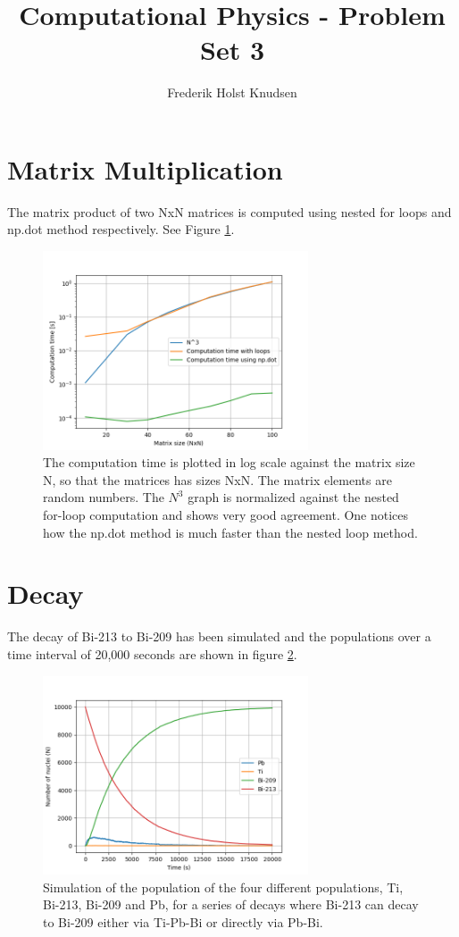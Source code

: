 \documentclass[11pt]{article}
\title{Computational Physics -  Problem Set 3}
\author{Frederik Holst Knudsen}
\begin{document}
\maketitle

\section{Matrix Multiplication}
The matrix product of two NxN matrices is computed using nested for loops and np.dot method respectively. See Figure \ref*{MM}.

\begin{figure}[!htbp]
    \centering
    \includegraphics[width=0.7\textwidth]{loops_comp.png}
    \caption{The computation time is plotted in log scale against the matrix size N, so that the matrices has sizes NxN. The matrix elements are random numbers. The $N^3$ graph is normalized against the nested for-loop computation and shows very good agreement. One notices how the np.dot method is much faster than the nested loop method.}
    \label{MM}
\end{figure}


\section{Decay}
The decay of Bi-213 to Bi-209 has been simulated and the populations over a time interval of 20,000 seconds are shown in figure \ref{dec}.
\begin{figure}[!htbp]
    \centering
    \includegraphics[width=0.7\textwidth]{Decay.png}
    \caption{Simulation of the population of the four different populations, Ti, Bi-213, Bi-209 and Pb, for a series of decays where Bi-213 can decay to Bi-209 either via Ti-Pb-Bi or directly via Pb-Bi.}
    \label{dec}
\end{figure}
\end{document}
